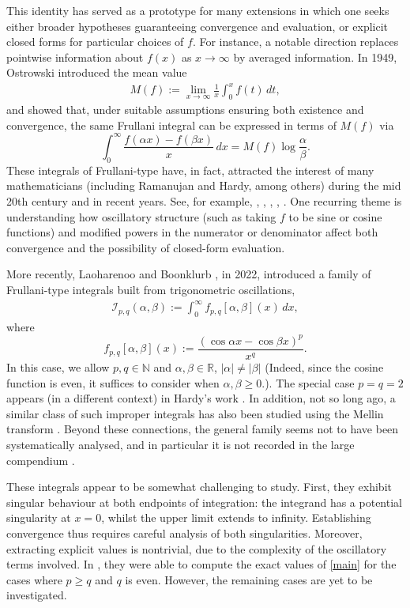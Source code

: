 \documentclass[12pt, reqno]{amsart}
\theoremstyle{plain}
\theoremstyle{definition}
\begin{document}
This identity has served as a prototype for many extensions in which one seeks either broader hypotheses guaranteeing convergence and evaluation, or explicit closed forms for particular choices of $f$. For instance, a notable direction replaces pointwise information about $f(x)$ as $x\to\infty$ by averaged information. In 1949, Ostrowski \cite{OS} introduced the mean value
\begin{align}\label{mean_rewrite}
M(f):=\lim_{x\to\infty}\frac1x\int_0^x f(t)\,dt,
\end{align}
and showed that, under suitable assumptions ensuring both existence and convergence, the same Frullani integral can be expressed in terms of $M(f)$ via
\[
\int_0^\infty \frac{f(\alpha x)-f(\beta x)}{x}\,dx = M(f)\log\frac{\alpha}{\beta}.
\]
These integrals of Frullani-type have, in fact, attracted the interest of many mathematicians (including Ramanujan and Hardy, among others) during the mid 20th century and in recent years. See, for example, \cite{JB}, \cite{AJP}, \cite{ARP}, \cite{BS}, \cite{RM}. One recurring theme is understanding how oscillatory structure (such as taking $f$ to be sine or cosine functions) and modified powers in the numerator or denominator affect both convergence and the possibility of closed-form evaluation.

More recently, Laoharenoo and Boonklurb \cite{AL}, in 2022, introduced a family of Frullani-type integrals built from trigonometric oscillations,
\begin{align}\label{main}
    \mathcal{I}_{p, q}(\alpha, \beta):=\int_0^\infty f_{p, q}[\alpha, \beta](x)\,dx,
\end{align}
where \[f_{p, q}[\alpha, \beta](x):=\frac{(\cos \alpha x-\cos \beta x)^p}{x^q}.\]
In this case, we allow $p,q\in\mathbb{N}$ and $\alpha, \beta\in\mathbb{R}$, $|\alpha|\ne|\beta|$ (Indeed, since the cosine function is even, it suffices to consider when $\alpha, \beta\ge 0$.).
The special case $p=q=2$ appears (in a different context) in Hardy’s work \cite{GHH}. In addition, not so long ago, a similar class of such improper integrals has also been studied using the Mellin transform \cite{maag}. Beyond these connections, the general family seems not to have been systematically analysed, and in particular it is not recorded in the large compendium \cite{II}.

These integrals appear to be somewhat challenging to study. First, they exhibit singular behaviour at both endpoints of integration: the integrand has a potential singularity at $x=0$, whilst the upper limit extends to infinity. Establishing convergence thus requires careful analysis of both singularities. Moreover, extracting explicit values is nontrivial, due to the complexity of the oscillatory terms involved.
In \cite{AL}, they were able to compute the exact values of \eqref{main} for the cases where $p\ge q$ and $q$ is even. However, the remaining cases are yet to be investigated.
\end{document}
